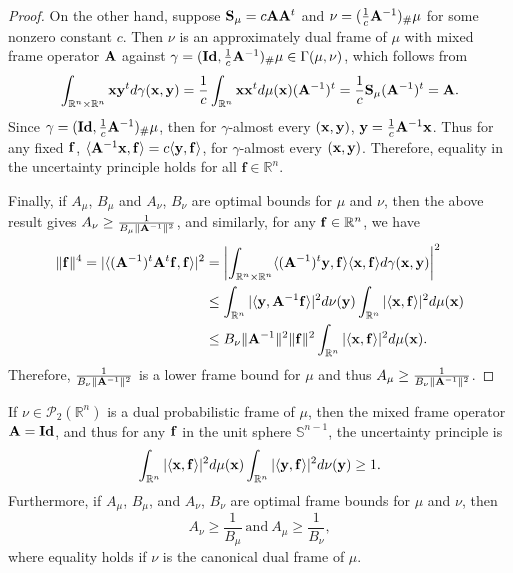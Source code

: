 \documentclass{amsart}
\numberwithin{equation}{section}
\theoremstyle{plain}
\theoremstyle{remark}
\theoremstyle{definition}
\begin{document}
\begin{proof}
On the other hand, suppose ${\bf S}_{\mu}=c{\bf A}{\bf A}^{t}$ and
$\nu=(\frac{1}{c}{\bf A}^{-1})_{\#}\mu$ for some nonzero constant $c$.
Then $\nu$ is an approximately dual frame of $\mu$ with mixed frame operator ${\bf A}$ against $\gamma = (\mathbf{Id}, \frac{1}{c}{\bf A}^{-1})_\#\mu \in \Gamma(\mu, \nu)$, which follows from 
   $$   \int_{\mathbb{R}^n \times \mathbb{R}^n} {\bf x} {\bf y}^t d\gamma({\bf x, y}) = \frac{1}{c} \int_{\mathbb{R}^n} {\bf x} {\bf x}^t d\mu({\bf x}) ({\bf A}^{-1})^t = \frac{1}{c} {\bf S}_{\mu} ({\bf A}^{-1})^t = {\bf A}.
   $$
Since  $\gamma = (\mathbf{Id}, \frac{1}{c}{\bf A}^{-1})_\#\mu$, then for $\gamma$-almost every $({\bf x},{\bf y})$, ${\bf y}=\frac{1}{c}{\bf A}^{-1}{\bf x}$. Thus for any fixed ${\bf f}$, 
$\langle {\bf A}^{-1}{\bf x},{\bf f}\rangle
= c \langle {\bf y},{\bf f}\rangle$, for $\gamma$-almost every $({\bf x},{\bf y})$. 
Therefore, equality in the uncertainty principle holds for all $\mathbf{f} \in \mathbb{R}^n$. 


 Finally, if $A_\mu$, $B_\mu$ and $A_\nu$, $B_\nu$ are optimal bounds for $\mu$ and $\nu$, then the above result gives $ A_\nu \geq \frac{1}{B_\mu \| {\bf A}^{-1}\|^2}$, and similarly,  for any ${\bf f} \in \mathbb{R}^n$, we have 
   \begin{equation*}
   \begin{split}
       \|{\bf f}\|^4  = |\langle ({\bf A}^{-1})^t{\bf A}^t{\bf f}, {\bf f} \rangle|^2 &= \left|\int_{\mathbb{R}^n \times \mathbb{R}^n} \langle ({\bf A}^{-1})^t {\bf y}, {\bf f} \rangle \langle {\bf x,f} \rangle d\gamma({\bf x, y}) \right |^2 \\
       & \leq  \int_{\mathbb{R}^n} |\langle {\bf y}, {\bf A}^{-1} {\bf f} \rangle |^2 d\nu({\bf y}) \int_{\mathbb{R}^n} |\langle {\bf x}, {\bf f} \rangle |^2 d\mu({\bf x})\\
       &\leq B_\nu \|{\bf A }^{-1}\|^2 \| {\bf f}\|^2 \int_{\mathbb{R}^n} |\langle {\bf x}, {\bf f} \rangle |^2 d\mu({\bf x}).
   \end{split}
   \end{equation*}
Therefore, $\frac{1}{B_\nu \| {\bf A}^{-1}\|^2}$ is a lower frame bound for $\mu$ and thus $A_\mu \geq \frac{1}{B_\nu \| {\bf A}^{-1}\|^2}$.
\end{proof}



If $\nu \in \mathcal{P}_2(\mathbb{R}^n)$ is a dual probabilistic frame of $\mu$, then the mixed frame operator ${\bf A} = {\bf Id}$, and thus for any ${\bf f}$ in the unit sphere $ \mathbb{S}^{n-1}$, the uncertainty principle is 
     \begin{equation*}
        \int_{\mathbb{R}^n} |\langle {\bf x}, {\bf f} \rangle |^2 d\mu({\bf x}) \int_{\mathbb{R}^n} |\langle {\bf y}, {\bf f} \rangle |^2 d\nu({\bf y})  \geq 1.
    \end{equation*}
Furthermore, if $A_\mu$, $B_\mu$, and $A_\nu$, $B_\nu$ are optimal frame bounds for $\mu$ and $\nu$, then 
\begin{equation*}
    A_\nu \geq \frac{1}{B_\mu } \ \text{and} \ A_\mu \geq \frac{1}{B_\nu},
\end{equation*}
where equality holds if $\nu$ is the canonical dual frame of $\mu$. 
\end{document}
